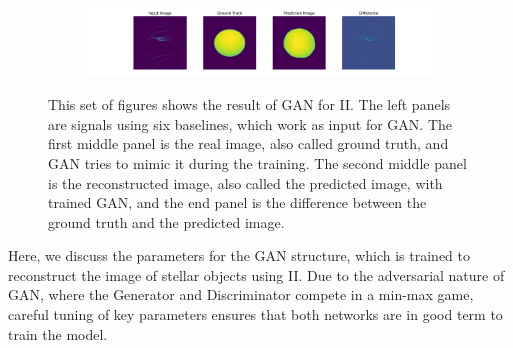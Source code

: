 \begin{figure}
\begin{subfigure}{\linewidth}
	\end{subfigure}
	\begin{subfigure}{\linewidth}
		\includegraphics[width=\linewidth]{fig/testing_image/image_47.png}
	\end{subfigure}
	\caption{This set of figures shows the result of GAN for II. The left panels are signals using six baselines, which work as input for GAN. The first middle panel is the real image, also called ground truth, and GAN tries to mimic it during the training. The second middle panel is the reconstructed image, also called the predicted image, with trained GAN, and the end panel is the difference between the ground truth and the predicted image.}
	\label{fig:GAN}
\end{figure}
Here, we discuss the parameters for the GAN structure, which is trained to reconstruct the image of stellar objects using II. Due to the adversarial nature of GAN, where the Generator and Discriminator compete in a min-max game, careful tuning of key parameters ensures that both networks are in good term to train the model.

